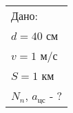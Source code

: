\solutionSection

\begin{tabular}{l|}
    Дано: \\
    $d = 40$ см \\
    $v = 1$ м/с \\
    $S = 1$ км
    \hline \\
    $N_n$, $a_\text{цс}$ - ?
\end{tabular}